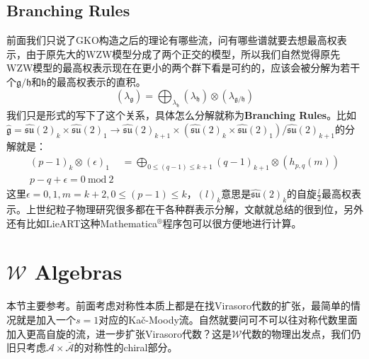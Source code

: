 \subsection{Branching Rules}
前面我们只说了GKO构造之后的理论有哪些流，问有哪些谱就要去想最高权表示，由于原先大的WZW模型分成了两个正交的模型，所以我们自然觉得原先WZW模型的最高权表示现在在更小的两个群下看是可约的，应该会被分解为若干个$\mathfrak{g}/\mathfrak{h}$和$\mathfrak{h}$的最高权表示的直积。
\begin{equation}
	\left(\lambda_\mathfrak{g}\right)=\bigoplus_{\lambda_\mathfrak{h}}\left(\lambda_\mathfrak{h}\right)\otimes\left(\lambda_{\mathfrak{g}/\mathfrak{h}}\right)
\end{equation}
我们只是形式的写下了这个关系，具体怎么分解就称为\textbf{Branching Rules}。比如$\hat{\mathfrak{g}}=\widehat{\mathfrak{su}}(2)_k\times\widehat{\mathfrak{su}}(2)_1\to \widehat{\mathfrak{su}}(2)_{k+1}\times (\widehat{\mathfrak{su}}(2)_k\times\widehat{\mathfrak{su}}(2)_1)/\widehat{\mathfrak{su}}(2)_{k+1}$的分解就是：
\begin{equation}
	\begin{aligned}\left(p-1\right)_k\otimes\left(\epsilon\right)_1&=\bigoplus_{0\leq(q-1)\leq k+1}\left(q-1\right)_{k+1}\otimes\left(h_{p,q}(m)\right)\\p-q+\epsilon=0\mathrm{~mod~}2\end{aligned}
\end{equation}
这里$\epsilon=0,1,m=k+2,0\leq(p-1)\leq k$，$(l)_k$意思是$\widehat{\mathfrak{su}}(2)_k$的自旋$\frac{l}{2}$最高权表示。上世纪粒子物理研究很多都在干各种群表示分解，文献\cite{Slansky:1981yr}就总结的很到位，另外还有比如LieART\cite{Feger:2012bs,Feger:2019tvk}这种Mathematica$^\circledR$程序包可以很方便地进行计算。
\section{$\mathcal{W}$ Algebras}
本节主要参考\cite{Pope:1991ig}。前面考虑对称性本质上都是在找Virasoro代数的扩张，最简单的情况就是加入一个$s=1$对应的Ka\v{c}\mbox{-}Moody流。自然就要问可不可以往对称代数里面加入更高自旋的流，进一步扩张Virasoro代数？这是$\mathcal{W}$代数的物理出发点，我们仍旧只考虑$\mathcal{A}\times\bar{\mathcal{A}}$的对称性的chiral部分。

